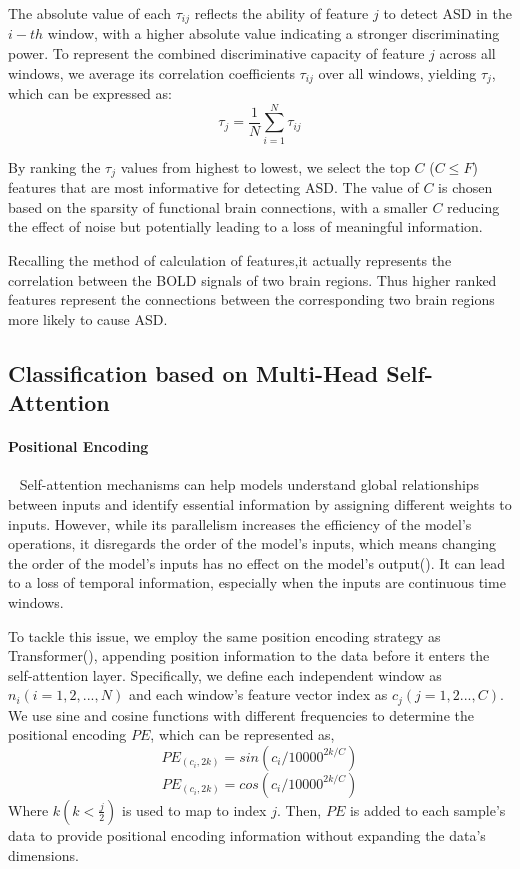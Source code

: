 \documentclass[a4paper]{cas-dc}
\begin{document}
The absolute value of each $\tau_{ij}$ reflects the ability of feature $j$ to detect ASD in the $i-th$ window, with a higher absolute value indicating a stronger discriminating power. To represent the combined discriminative capacity of feature $j$ across all windows, we average its correlation coefficients $\tau_{ij}$ over all windows, yielding $\tau_{j}$, which can be expressed as:
\begin{equation}
	\tau_{j} =  \frac{1}{N}\sum_{i=1}^{N}\tau_{ij}
\end{equation}

By ranking the $\tau_{j}$ values from highest to lowest, we select the top $C$ ($C\leq F$) features that are most informative for detecting ASD. The value of $C$ is chosen based on the sparsity of functional brain connections, with a smaller $C$ reducing the effect of noise but potentially leading to a loss of meaningful information. 

Recalling the method of calculation of features,it actually represents the correlation between the BOLD signals of two brain regions. Thus higher ranked features represent the connections between the corresponding two brain regions more likely to cause ASD.
\subsection{Classification based on Multi-Head Self-Attention}
\paragraph{Positional Encoding}~{}
\newline
\indent Self-attention mechanisms can help models understand global relationships between inputs and identify essential information by assigning different weights to inputs. However, while its parallelism increases the efficiency of the model's operations, it disregards the order of the model's inputs, which means changing the order of the model's inputs has no effect on the model's output(\cite{litjens2017survey}). It can lead to a loss of temporal information, especially when the inputs are continuous time windows.

To tackle this issue, we employ the same position encoding strategy as Transformer(\cite{vaswani2017attention}), appending position information to the data before it enters the self-attention layer. Specifically, we define each independent window as $n_i(i=1,2,..., N)$ and each window's feature vector index as $c_j(j=1,2..., C)$. We use sine and cosine functions with different frequencies to determine the positional encoding $PE$, which can be represented as,
\begin{equation}
	PE_{(c_i,2k)}=sin(c_i/10000^{2k/C})
\end{equation}
\begin{equation}
	PE_{(c_i,2k)}=cos(c_i/10000^{2k/C})
\end{equation}
Where $k(k<\frac{j}{2})$ is used to map to index $j$. Then, $PE$ is added to each sample's data to provide positional encoding information without expanding the data's dimensions.
\end{document}
